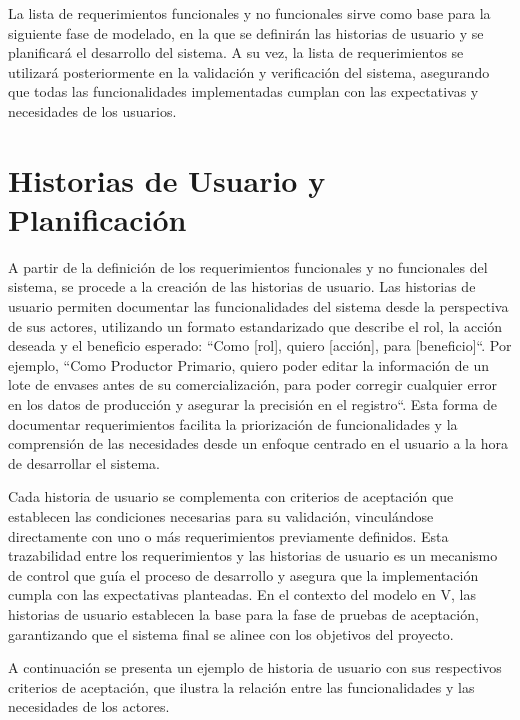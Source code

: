 La lista de requerimientos funcionales y no funcionales sirve como base para la siguiente fase de modelado, en la que se definirán las historias de usuario y se planificará el desarrollo del sistema. A su vez, la lista de requerimientos se utilizará posteriormente en la validación y verificación del sistema, asegurando que todas las funcionalidades implementadas cumplan con las expectativas y necesidades de los usuarios.


\section{Historias de Usuario y Planificación}
\label{sec:user-stories}

A partir de la definición de los requerimientos funcionales y no funcionales del sistema, se procede a la creación de las historias de usuario. Las historias de usuario permiten documentar las funcionalidades del sistema desde la perspectiva de sus actores, utilizando un formato estandarizado que describe el rol, la acción deseada y el beneficio esperado: ``Como [rol], quiero [acción], para [beneficio]``. Por ejemplo, ``Como Productor Primario,  
quiero poder editar la información de un lote de envases antes de su comercialización, para poder corregir cualquier error en los datos de producción y asegurar la precisión en el registro``. Esta forma de documentar requerimientos facilita la priorización de funcionalidades y la comprensión de las necesidades desde un enfoque centrado en el usuario a la hora de desarrollar el sistema.

Cada historia de usuario se complementa con criterios de aceptación que establecen las condiciones necesarias para su validación, vinculándose directamente con uno o más requerimientos previamente definidos. Esta trazabilidad entre los requerimientos y las historias de usuario es un mecanismo de control que guía el proceso de desarrollo y asegura que la implementación cumpla con las expectativas planteadas. En el contexto del modelo en V, las historias de usuario establecen la base para la fase de pruebas de aceptación, garantizando que el sistema final se alinee con los objetivos del proyecto.

A continuación se presenta un ejemplo de historia de usuario con sus respectivos criterios de aceptación, que ilustra la relación entre las funcionalidades y las necesidades de los actores.

